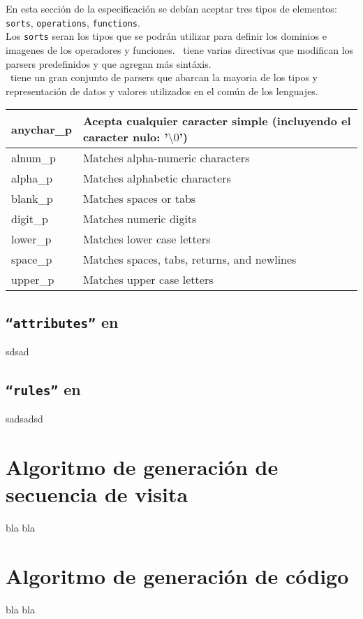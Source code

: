 En esta sección de la especificación se debían aceptar tres tipos de elementos: \texttt{sorts}, \texttt{operations}, \texttt{functions}.\\
Los \texttt{sorts} seran los tipos que se podrán utilizar para definir los dominios e imagenes de los operadores y funciones. \spirit\ tiene varias directivas que modifican los parsers predefinidos y que agregan más sintáxis.\\
\spirit\ tiene un gran conjunto de parsers que abarcan la mayoria de los tipos y representación de datos y valores utilizados en el común de los lenguajes.

\begin{tabular}{| l | l |}
\hline
anychar\_p &  Acepta cualquier caracter simple (incluyendo el caracter nulo: '$\setminus0$')\\ \hline
alnum\_p   &  Matches alpha-numeric characters \\ \hline
alpha\_p   &  Matches alphabetic characters \\ \hline
blank\_p   &  Matches spaces or tabs \\ \hline
digit\_p   &  Matches numeric digits \\ \hline
lower\_p   &  Matches lower case letters \\ \hline
space\_p   &  Matches spaces, tabs, returns, and newlines \\ \hline
upper\_p   &  Matches upper case letters \\ \hline

\end{tabular}


\subsection{\texttt{``attributes''} en \spirit }
sdsad


\subsection{\texttt{``rules''} en \spirit }

sadsadsd

\section{Algoritmo de generaci\'on de secuencia de visita}

bla bla
\section{Algoritmo de generaci\'on de c\'odigo}
bla bla
